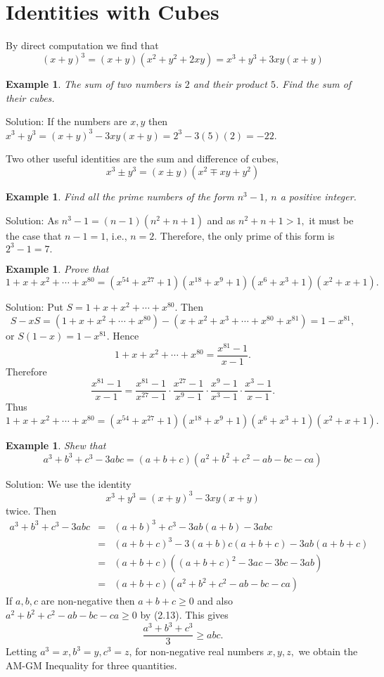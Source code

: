 \documentclass[11pt, openany]{book}
\theoremstyle{change} \theoremheaderfont{\blue\sffamily\bfseries}
\newtheorem{exa}[thm]{Example}
\theoremstyle{nonumberplain} \theoremheaderfont{\sffamily\bfseries}
\newcommand{\í}{\'{\i}}
\begin{document}
\section{Identities with Cubes} By direct
computation we find that
\begin{equation}
(x + y)^3 = (x + y)(x^2 + y^2 + 2xy) = x^3 + y^3 + 3xy(x + y)
\end{equation}
\begin{exa}
The sum of two numbers is $2$ and their product $5$. Find the sum
of their cubes.
\end{exa}
Solution: If the numbers are $x, y$ then $x^3 + y^3 = (x + y)^3 -
3xy(x + y) = 2^3 - 3(5)(2) = -22.$




Two other useful identities are the sum and difference of cubes,
\begin{equation}
 x^3 \pm y^3 = (x \pm y)(x^2 \mp xy + y^2)
 \end{equation}
\begin{exa} Find all the prime numbers of the form $n^3 - 1$, $n$ a positive integer.
\end{exa}
Solution: As $n^3 - 1 = (n - 1)(n^2 + n + 1)$ and as $n^2 + n + 1
> 1,$  it must be the case that $n - 1 = 1$, i.e., $n = 2$.
Therefore, the only prime of this form is  $2^3 - 1 = 7.$
\begin{exa} Prove that
$$1 + x + x^2 + \cdots + x^{80} = (x^{54} + x^{27} + 1)(x^{18} + x^9 + 1)(x^6 + x^3 + 1)(x^2 + x + 1).$$

\end{exa}

Solution: Put $S = 1 + x + x^2 + \cdots + x^{80}.$ Then
$$S - xS = (1 + x + x^2 + \cdots + x^{80}) - (x + x^2 + x^3 + \cdots + x^{80} + x^{81})
= 1 - x^{81},$$or $S(1 - x) = 1 - x^{81}$. Hence
$$1 + x + x^2 + \cdots + x^{80} = \frac{x^{81} - 1}{x - 1}.$$
Therefore
$$\frac{x^{81} - 1}{x - 1} = \frac{x^{81} - 1}{x^{27} - 1}\cdot\frac{x^{27} - 1}{x^{9} - 1}\cdot\frac{x^{9} - 1}{x^3 - 1}\cdot\frac{x^{3} - 1}{x - 1}.$$
Thus
$$1 + x + x^2 + \cdots + x^{80} = (x^{54} + x^{27} + 1)(x^{18} + x^9 + 1)(x^6 + x^3 + 1)(x^2 + x + 1).$$
\begin{exa}
Shew that
\begin{equation}
a^3 + b^3 + c^3 - 3abc =  (a + b + c)(a^2 + b^2 + c^2 - ab - bc -
ca)
\end{equation}
\end{exa}
Solution: We use the identity
$$x^3 + y^3 = (x + y)^3 - 3xy(x + y)$$twice. Then
$$
\begin{array}{lll}
a^3 + b^3 + c^3 - 3abc & = & (a + b)^3 + c^3 - 3ab(a + b) - 3abc \\
& = & (a + b + c)^3 - 3(a + b)c(a + b + c) - 3ab(a + b + c) \\
& = & (a + b + c)((a + b + c)^2 - 3ac - 3bc - 3ab) \\
& = & (a + b + c)(a^2 + b^2 + c^2 - ab - bc - ca)
\end{array}
$$
If $a, b, c$ are non-negative then $a + b + c \geq 0$ and also
$a^2 + b^2 + c^2 - ab - bc - ca \geq 0$ by (2.13). This gives
$$\frac{a^3 + b^3 + c^3}{3} \geq abc.$$Letting $a^3 = x, b^3 = y, c^3 = z$,
for non-negative real numbers $x, y, z,$ we obtain the AM-GM
Inequality for three quantities.
\end{document}
